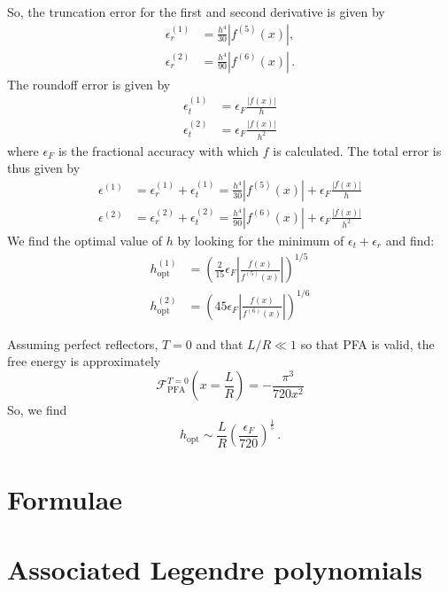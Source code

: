 \documentclass[superscriptaddress,prb]{revtex4-1}
\begin{document}
So, the truncation error for the first and second derivative is given by
\begin{align}
\epsilon_r^{(1)} &= \frac{h^4}{30} \left| f^{(5)}(x) \right|, \\
\epsilon_r^{(2)} &= \frac{h^4}{90} \left| f^{(6)}(x) \right| \,.
\end{align}
The roundoff error is given by \cite{NumericalRecipes}
\begin{align}
\epsilon_t^{(1)} &= \epsilon_F \frac{|f(x)|}{h} \\
\epsilon_t^{(2)} &= \epsilon_F \frac{|f(x)|}{h^2}
\end{align}
where $\epsilon_F$
is the fractional accuracy with which $f$ is calculated.
The total error is thus given by
\begin{align}
\epsilon^{(1)} &= \epsilon_r^{(1)} + \epsilon_t^{(1)} = \frac{h^4}{30}\left|f^{(5)}(x)\right| + \epsilon_F \frac{|f(x)|}{h} \\
\epsilon^{(2)} &= \epsilon_r^{(2)} + \epsilon_t^{(2)} = \frac{h^4}{90}\left|f^{(6)}(x)\right| + \epsilon_F \frac{|f(x)|}{h^2}
\end{align}
We find the optimal value of $h$ by looking
for the minimum of $\epsilon_t + \epsilon_r$ and find:
\begin{align}
h^{(1)}_\text{opt} &= \left( \frac{2}{15} \epsilon_F \left|\frac{f(x)}{f^{(5)}(x)}\right| \right)^{1/5} \\
h^{(2)}_\text{opt} &= \left( 45 \epsilon_F \left|\frac{f(x)}{f^{(6)}(x)}\right| \right)^{1/6}
\end{align}

Assuming perfect reflectors, $T=0$ and that $L/R \ll 1$ so that PFA is valid, the free energy is approximately
\begin{equation}
\mathcal{F}_\text{PFA}^{T=0}\left(x=\frac{L}{R}\right) = -\frac{\pi^3}{720x^2}
\end{equation}
So, we find
\begin{equation}
h_\text{opt} \sim \frac{L}{R} \left(\frac{\epsilon_F}{720}\right)^\frac{1}{5} \,.
\end{equation}

\appendix

\section{Formulae}


\section{Associated Legendre polynomials}
\end{document}
